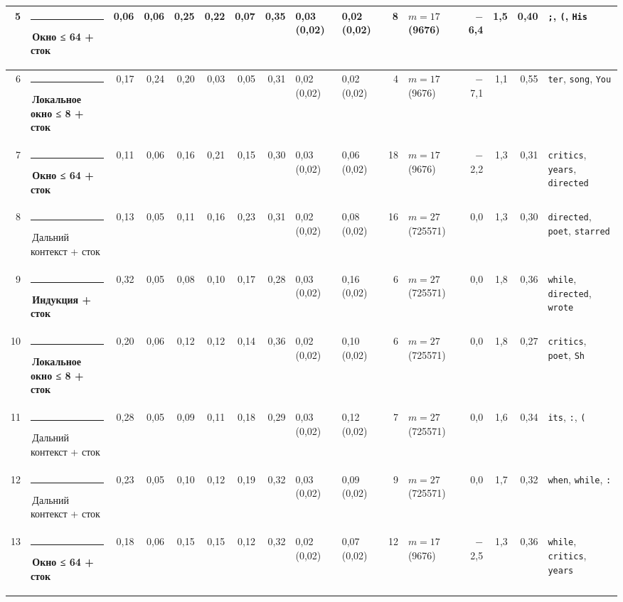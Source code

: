 \documentclass[10pt]{article}
\begin{document}
\begin{minipage}{\linewidth}
\begin{center}
{\begin{tabular}{|r|l|r|r|r|r|r|r|l|l|r|l|r|r|r|l|}
5 & \textcolor[HTML]{EDA100}{\rule{0.62em}{0.62em}}\,\textbf{Окно ≤ 64 + сток} & 0,06 & 0,06 & 0,25 & 0,22 & 0,07 & 0,35 & 0,03 (0,02) & 0,02 (0,02) & 8 & $m{=}17$ (9676) & $-$6,4 & 1,5 & 0,40 & \texttt{\textvisiblespace{};}, \texttt{\textvisiblespace{}(}, \texttt{\textvisiblespace{}His} \\ \hline
6 & \textcolor[HTML]{1BAF7A}{\rule{0.62em}{0.62em}}\,\textbf{Локальное окно ≤ 8 + сток} & 0,17 & 0,24 & 0,20 & 0,03 & 0,05 & 0,31 & 0,02 (0,02) & 0,02 (0,02) & 4 & $m{=}17$ (9676) & $-$7,1 & 1,1 & 0,55 & \texttt{ter}, \texttt{\textvisiblespace{}song}, \texttt{\textvisiblespace{}You} \\ \hline
7 & \textcolor[HTML]{EDA100}{\rule{0.62em}{0.62em}}\,\textbf{Окно ≤ 64 + сток} & 0,11 & 0,06 & 0,16 & 0,21 & 0,15 & 0,30 & 0,03 (0,02) & 0,06 (0,02) & 18 & $m{=}17$ (9676) & $-$2,2 & 1,3 & 0,31 & \texttt{\textvisiblespace{}critics}, \texttt{\textvisiblespace{}years}, \texttt{\textvisiblespace{}directed} \\ \hline
8 & \textcolor[HTML]{C3C2B7}{\rule{0.62em}{0.62em}}\,Дальний контекст + сток & 0,13 & 0,05 & 0,11 & 0,16 & 0,23 & 0,31 & 0,02 (0,02) & 0,08 (0,02) & 16 & $m{=}27$ (725571) & 0,0 & 1,3 & 0,30 & \texttt{\textvisiblespace{}directed}, \texttt{\textvisiblespace{}poet}, \texttt{\textvisiblespace{}starred} \\ \hline
9 & \textcolor[HTML]{008300}{\rule{0.62em}{0.62em}}\,\textbf{Индукция + сток} & 0,32 & 0,05 & 0,08 & 0,10 & 0,17 & 0,28 & 0,03 (0,02) & 0,16 (0,02) & 6 & $m{=}27$ (725571) & 0,0 & 1,8 & 0,36 & \texttt{\textvisiblespace{}while}, \texttt{\textvisiblespace{}directed}, \texttt{\textvisiblespace{}wrote} \\ \hline
10 & \textcolor[HTML]{1BAF7A}{\rule{0.62em}{0.62em}}\,\textbf{Локальное окно ≤ 8 + сток} & 0,20 & 0,06 & 0,12 & 0,12 & 0,14 & 0,36 & 0,02 (0,02) & 0,10 (0,02) & 6 & $m{=}27$ (725571) & 0,0 & 1,8 & 0,27 & \texttt{\textvisiblespace{}critics}, \texttt{\textvisiblespace{}poet}, \texttt{\textvisiblespace{}Sh} \\ \hline
11 & \textcolor[HTML]{C3C2B7}{\rule{0.62em}{0.62em}}\,Дальний контекст + сток & 0,28 & 0,05 & 0,09 & 0,11 & 0,18 & 0,29 & 0,03 (0,02) & 0,12 (0,02) & 7 & $m{=}27$ (725571) & 0,0 & 1,6 & 0,34 & \texttt{\textvisiblespace{}its}, \texttt{\textvisiblespace{}:}, \texttt{\textvisiblespace{}(} \\ \hline
12 & \textcolor[HTML]{C3C2B7}{\rule{0.62em}{0.62em}}\,Дальний контекст + сток & 0,23 & 0,05 & 0,10 & 0,12 & 0,19 & 0,32 & 0,03 (0,02) & 0,09 (0,02) & 9 & $m{=}27$ (725571) & 0,0 & 1,7 & 0,32 & \texttt{\textvisiblespace{}when}, \texttt{\textvisiblespace{}while}, \texttt{\textvisiblespace{}:} \\ \hline
13 & \textcolor[HTML]{EDA100}{\rule{0.62em}{0.62em}}\,\textbf{Окно ≤ 64 + сток} & 0,18 & 0,06 & 0,15 & 0,15 & 0,12 & 0,32 & 0,02 (0,02) & 0,07 (0,02) & 12 & $m{=}17$ (9676) & $-$2,5 & 1,3 & 0,36 & \texttt{\textvisiblespace{}while}, \texttt{\textvisiblespace{}critics}, \texttt{\textvisiblespace{}years} \\ \hline
\hline\end{tabular}}\end{center}
\end{minipage}
\end{document}
